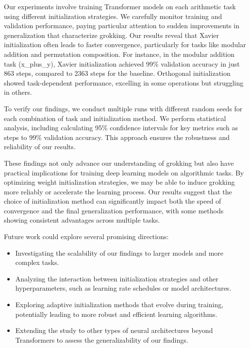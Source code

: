 \documentclass{article} %
\begin{document}
Our experiments involve training Transformer models on each arithmetic task using different initialization strategies. We carefully monitor training and validation performance, paying particular attention to sudden improvements in generalization that characterize grokking. Our results reveal that Xavier initialization often leads to faster convergence, particularly for tasks like modular addition and permutation composition. For instance, in the modular addition task (x\_plus\_y), Xavier initialization achieved 99\% validation accuracy in just 863 steps, compared to 2363 steps for the baseline. Orthogonal initialization showed task-dependent performance, excelling in some operations but struggling in others.

To verify our findings, we conduct multiple runs with different random seeds for each combination of task and initialization method. We perform statistical analysis, including calculating 95\% confidence intervals for key metrics such as steps to 99\% validation accuracy. This approach ensures the robustness and reliability of our results.

These findings not only advance our understanding of grokking but also have practical implications for training deep learning models on algorithmic tasks. By optimizing weight initialization strategies, we may be able to induce grokking more reliably or accelerate the learning process. Our results suggest that the choice of initialization method can significantly impact both the speed of convergence and the final generalization performance, with some methods showing consistent advantages across multiple tasks.

Future work could explore several promising directions:

\begin{itemize}
    \item Investigating the scalability of our findings to larger models and more complex tasks.
    \item Analyzing the interaction between initialization strategies and other hyperparameters, such as learning rate schedules or model architectures.
    \item Exploring adaptive initialization methods that evolve during training, potentially leading to more robust and efficient learning algorithms.
    \item Extending the study to other types of neural architectures beyond Transformers to assess the generalizability of our findings.
\end{itemize}
\end{document}

